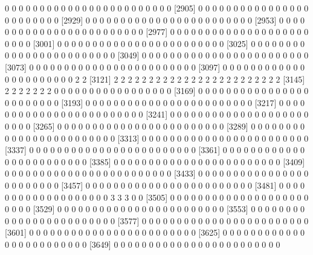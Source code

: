 \documentclass[11pt]{article}
\begin{document}
\begin{Schunk}
\begin{Soutput}
 [2881]  0  0  0  0  0  0  0  0  0  0  0  0  0  0  0  0  0  0  0  0  0  0  0  0
 [2905]  0  0  0  0  0  0  0  0  0  0  0  0  0  0  0  0  0  0  0  0  0  0  0  0
 [2929]  0  0  0  0  0  0  0  0  0  0  0  0  0  0  0  0  0  0  0  0  0  0  0  0
 [2953]  0  0  0  0  0  0  0  0  0  0  0  0  0  0  0  0  0  0  0  0  0  0  0  0
 [2977]  0  0  0  0  0  0  0  0  0  0  0  0  0  0  0  0  0  0  0  0  0  0  0  0
 [3001]  0  0  0  0  0  0  0  0  0  0  0  0  0  0  0  0  0  0  0  0  0  0  0  0
 [3025]  0  0  0  0  0  0  0  0  0  0  0  0  0  0  0  0  0  0  0  0  0  0  0  0
 [3049]  0  0  0  0  0  0  0  0  0  0  0  0  0  0  0  0  0  0  0  0  0  0  0  0
 [3073]  0  0  0  0  0  0  0  0  0  0  0  0  0  0  0  0  0  0  0  0  0  0  0  0
 [3097]  0  0  0  0  0  0  0  0  0  0  0  0  0  0  0  0  0  0  0  0  0  0  2  2
 [3121]  2  2  2  2  2  2  2  2  2  2  2  2  2  2  2  2  2  2  2  2  2  2  2  2
 [3145]  2  2  2  2  2  2  2  0  0  0  0  0  0  0  0  0  0  0  0  0  0  0  0  0
 [3169]  0  0  0  0  0  0  0  0  0  0  0  0  0  0  0  0  0  0  0  0  0  0  0  0
 [3193]  0  0  0  0  0  0  0  0  0  0  0  0  0  0  0  0  0  0  0  0  0  0  0  0
 [3217]  0  0  0  0  0  0  0  0  0  0  0  0  0  0  0  0  0  0  0  0  0  0  0  0
 [3241]  0  0  0  0  0  0  0  0  0  0  0  0  0  0  0  0  0  0  0  0  0  0  0  0
 [3265]  0  0  0  0  0  0  0  0  0  0  0  0  0  0  0  0  0  0  0  0  0  0  0  0
 [3289]  0  0  0  0  0  0  0  0  0  0  0  0  0  0  0  0  0  0  0  0  0  0  0  0
 [3313]  0  0  0  0  0  0  0  0  0  0  0  0  0  0  0  0  0  0  0  0  0  0  0  0
 [3337]  0  0  0  0  0  0  0  0  0  0  0  0  0  0  0  0  0  0  0  0  0  0  0  0
 [3361]  0  0  0  0  0  0  0  0  0  0  0  0  0  0  0  0  0  0  0  0  0  0  0  0
 [3385]  0  0  0  0  0  0  0  0  0  0  0  0  0  0  0  0  0  0  0  0  0  0  0  0
 [3409]  0  0  0  0  0  0  0  0  0  0  0  0  0  0  0  0  0  0  0  0  0  0  0  0
 [3433]  0  0  0  0  0  0  0  0  0  0  0  0  0  0  0  0  0  0  0  0  0  0  0  0
 [3457]  0  0  0  0  0  0  0  0  0  0  0  0  0  0  0  0  0  0  0  0  0  0  0  0
 [3481]  0  0  0  0  0  0  0  0  0  0  0  0  0  0  0  0  0  0  0  3  3  3  0  0
 [3505]  0  0  0  0  0  0  0  0  0  0  0  0  0  0  0  0  0  0  0  0  0  0  0  0
 [3529]  0  0  0  0  0  0  0  0  0  0  0  0  0  0  0  0  0  0  0  0  0  0  0  0
 [3553]  0  0  0  0  0  0  0  0  0  0  0  0  0  0  0  0  0  0  0  0  0  0  0  0
 [3577]  0  0  0  0  0  0  0  0  0  0  0  0  0  0  0  0  0  0  0  0  0  0  0  0
 [3601]  0  0  0  0  0  0  0  0  0  0  0  0  0  0  0  0  0  0  0  0  0  0  0  0
 [3625]  0  0  0  0  0  0  0  0  0  0  0  0  0  0  0  0  0  0  0  0  0  0  0  0
 [3649]  0  0  0  0  0  0  0  0  0  0  0  0  0  0  0  0  0  0  0  0  0  0  0  0

\end{Soutput}
\end{Schunk}
\end{document}
